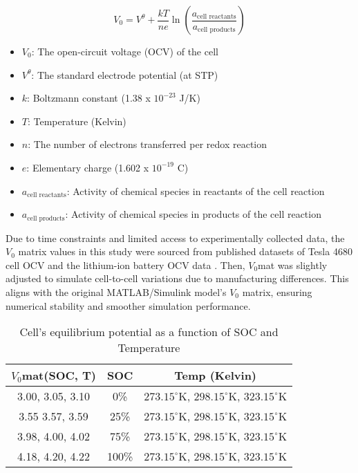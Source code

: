 \documentclass[conference]{IEEEtran}
\begin{document}
\begin{equation}
V_{\text{0}} = V^\theta + \frac{kT}{ne} \ln \left(\frac{a_{\text{cell reactants}}}{a_{\text{cell products}}} \right)
\end{equation}

\begin{itemize}
    \item $V_{\text{0}}$: The open-circuit voltage (OCV) of the cell
    \item $V^\theta$: The standard electrode potential (at STP)
    \item $k$: Boltzmann constant (1.38 x $10^{-23}$ J/K)
    \item $T$: Temperature (Kelvin)
    \item $n$: The number of electrons transferred per redox reaction
    \item $e$: Elementary charge (1.602 x $10^{-19}$ C)
    \item $a_{\text{cell reactants}}$: Activity of chemical species in reactants of the cell reaction
    \item $a_{\text{cell products}}$: Activity of chemical species in products of the cell reaction
\end{itemize}

Due to time constraints and limited access to experimentally collected data, the $V_{\text{0}}$ matrix values in this study were sourced from published datasets of Tesla 4680 cell OCV \cite{aboutenergy2023tesla} and the lithium-ion battery OCV data \cite{peng2022parameter}. Then, $V_{\text{0}}$mat was slightly adjusted to simulate cell-to-cell variations due to manufacturing differences. This aligns with the original MATLAB/Simulink model's $V_{\text{0}}$ matrix, ensuring numerical stability and smoother simulation performance.

\begin{table}[H]
\centering
\caption{Cell's equilibrium potential as a function of SOC and Temperature}
\begin{tabular}{|c|c|c|}
\hline
\textbf{$V_0$mat(SOC, T)} & \textbf{SOC} & \textbf{Temp (Kelvin)} \\
\hline
3.00, 3.05, 3.10 & 0\% & $273.15^\circ$K, $298.15^\circ$K, $323.15^\circ$K\\
3.55 3.57, 3.59  & 25\% & $273.15^\circ$K, $298.15^\circ$K, $323.15^\circ$K \\
3.98, 4.00, 4.02 & 75\% & $273.15^\circ$K, $298.15^\circ$K, $323.15^\circ$K \\
4.18, 4.20, 4.22 & 100\% & $273.15^\circ$K, $298.15^\circ$K, $323.15^\circ$K  \\
\hline
\end{tabular}
\end{table}
\end{document}
